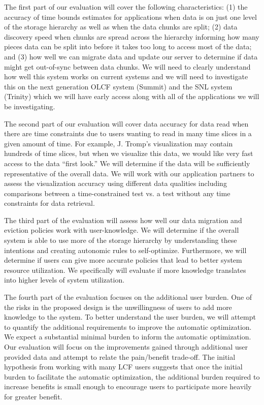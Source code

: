 The first part of our evaluation will cover the following characteristics: (1)
the accuracy of time bounds estimates for applications when data is on just one
level of the storage hierarchy as well as when the data chunks are split; (2)
data discovery speed when chunks are spread across the hierarchy informing how
many pieces data can be split into before it takes too long to access most of
the data; and (3) how well we can migrate data and update our server to
determine if data might get out-of-sync between data chunks.  We will need to
clearly understand how well this system works on current systems and we will
need to investigate this on the next generation OLCF system (Summit) and the
SNL system (Trinity) which we will have early access along with all of the
applications we will be investigating.

The second part of our evaluation will cover data accuracy for data read when
there are time constraints due to users wanting to read in many time slices in
a given amount of time. For example, J. Tromp's visualization may contain
hundreds of time slices, but when we visualize this data, we would like very
fast access to the data ``first look.'' We will determine if the data will be
sufficiently representative of the overall data.  We will work with our
application partners to assess the visualization accuracy using different data
qualities including comparisons between a time-constrained test vs. a test
without any time constraints for data retrieval.

The third part of the evaluation will assess how well our data migration and
eviction policies work with user-knowledge. We will determine if the overall
system is able to use more of the storage hierarchy by understanding these
intentions and creating autonomic rules to self-optimize. Furthermore, we will
determine if users can give more accurate policies that lead to better system
resource utilization. We specifically will evaluate if more knowledge
translates into higher levels of system utilization.

The fourth part of the evaluation focuses on the additional user burden. One of
the risks in the proposed design is the unwillingness of users to add more
knowledge to the system. To better understand the user burden, we will attempt
to quantify the additional requirements to improve the automatic optimization.
We expect a substantial minimal burden to inform the automatic optimization.
Our evaluation will focus on the improvements gained through additional user
provided data and attempt to relate the pain/benefit trade-off. The initial
hypothesis from working with many LCF users suggests that once the initial
burden to facilitate the automatic optimization, the additional burden required
to increase benefits is small enough to encourage users to participate more
heavily for greater benefit.

